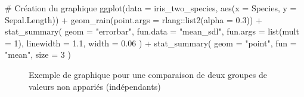 \documentclass[
  letterpaper,
]{book}
\newenvironment{Shaded}{\begin{snugshade}}{\end{snugshade}}
\newcommand{\AttributeTok}[1]{\textcolor[rgb]{0.40,0.45,0.13}{#1}}
\newcommand{\CommentTok}[1]{\textcolor[rgb]{0.37,0.37,0.37}{#1}}
\newcommand{\DecValTok}[1]{\textcolor[rgb]{0.68,0.00,0.00}{#1}}
\newcommand{\FloatTok}[1]{\textcolor[rgb]{0.68,0.00,0.00}{#1}}
\newcommand{\FunctionTok}[1]{\textcolor[rgb]{0.28,0.35,0.67}{#1}}
\newcommand{\NormalTok}[1]{\textcolor[rgb]{0.00,0.23,0.31}{#1}}
\newcommand{\SpecialCharTok}[1]{\textcolor[rgb]{0.37,0.37,0.37}{#1}}
\newcommand{\StringTok}[1]{\textcolor[rgb]{0.13,0.47,0.30}{#1}}
\begin{document}
\begin{Shaded}
\begin{Highlighting}[]
\CommentTok{\# Création du graphique}
\FunctionTok{ggplot}\NormalTok{(}\AttributeTok{data =}\NormalTok{ iris\_two\_species, }\FunctionTok{aes}\NormalTok{(}\AttributeTok{x =}\NormalTok{ Species, }\AttributeTok{y =}\NormalTok{ Sepal.Length)) }\SpecialCharTok{+}
  \FunctionTok{geom\_rain}\NormalTok{(}\AttributeTok{point.args =}\NormalTok{ rlang}\SpecialCharTok{::}\FunctionTok{list2}\NormalTok{(}\AttributeTok{alpha =} \FloatTok{0.3}\NormalTok{)) }\SpecialCharTok{+}
  \FunctionTok{stat\_summary}\NormalTok{(}
    \AttributeTok{geom =} \StringTok{"errorbar"}\NormalTok{,}
    \AttributeTok{fun.data =} \StringTok{"mean\_sdl"}\NormalTok{,}
    \AttributeTok{fun.args =} \FunctionTok{list}\NormalTok{(}\AttributeTok{mult =} \DecValTok{1}\NormalTok{),}
    \AttributeTok{linewidth =} \FloatTok{1.1}\NormalTok{, }
    \AttributeTok{width =} \FloatTok{0.06}
\NormalTok{    ) }\SpecialCharTok{+} 
  \FunctionTok{stat\_summary}\NormalTok{(}
    \AttributeTok{geom =} \StringTok{"point"}\NormalTok{,}
    \AttributeTok{fun =} \StringTok{"mean"}\NormalTok{, }
    \AttributeTok{size =} \DecValTok{3}
\NormalTok{    )}
\end{Highlighting}
\end{Shaded}

\begin{figure}[H]


\caption{\label{fig-raindcloudplotsBivUnpaired1}Exemple de graphique
pour une comparaison de deux groupes de valeurs non appariés
(indépendants)}

\end{figure}%
\end{document}
